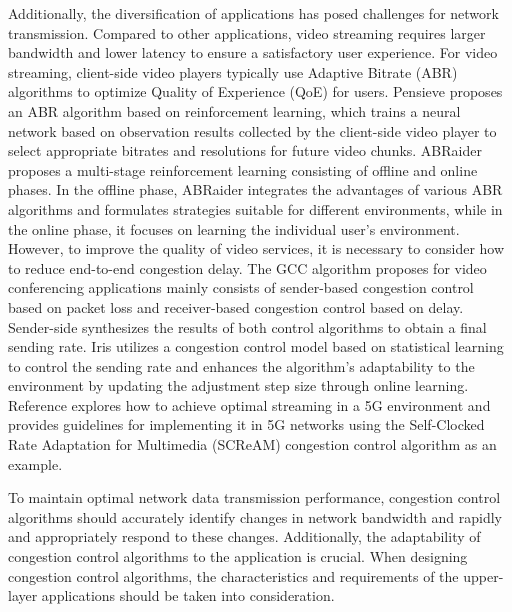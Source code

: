 Additionally, the diversification of applications has posed challenges for network transmission. Compared to other applications, video streaming requires larger bandwidth and lower latency to ensure a satisfactory user experience. For video streaming, client-side video players typically use Adaptive Bitrate (ABR) algorithms to optimize Quality of Experience (QoE) for users. Pensieve\cite{a42:H} proposes an ABR algorithm based on reinforcement learning, which trains a neural network based on observation results collected by the client-side video player to select appropriate bitrates and resolutions for future video chunks. ABRaider\cite{a43:W} proposes a multi-stage reinforcement learning consisting of offline and online phases. In the offline phase, ABRaider integrates the advantages of various ABR algorithms and formulates strategies suitable for different environments, while in the online phase, it focuses on learning the individual user's environment. However, to improve the quality of video services, it is necessary to consider how to reduce end-to-end congestion delay. The GCC\cite{a44:G} algorithm proposes for video conferencing applications mainly consists of sender-based congestion control based on packet loss and receiver-based congestion control based on delay. Sender-side synthesizes the results of both control algorithms to obtain a final sending rate. Iris\cite{a45:T} utilizes a congestion control model based on statistical learning to control the sending rate and enhances the algorithm's adaptability to the environment by updating the adjustment step size through online learning. Reference\cite{a46:A} explores how to achieve optimal streaming in a 5G environment and provides guidelines for implementing it in 5G networks using the Self-Clocked Rate Adaptation for Multimedia (SCReAM)\cite{a47:I} congestion control algorithm as an example.

To maintain optimal network data transmission performance, congestion control algorithms should accurately identify changes in network bandwidth and rapidly and appropriately respond to these changes. Additionally, the adaptability of congestion control algorithms to the application is crucial. When designing congestion control algorithms, the characteristics and requirements of the upper-layer applications should be taken into consideration.